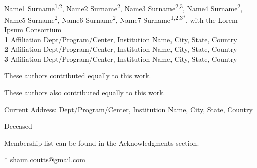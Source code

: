 \documentclass[10pt,letterpaper]{article}
\date{}
\begin{document}
\vspace*{0.2in}

\begin{flushleft}
{\Large
\textbf{} %
}
\newline
\\
Name1 Surname\textsuperscript{1,2\Yinyang},
Name2 Surname\textsuperscript{2\Yinyang},
Name3 Surname\textsuperscript{2,3\textcurrency},
Name4 Surname\textsuperscript{2},
Name5 Surname\textsuperscript{2\ddag},
Name6 Surname\textsuperscript{2\ddag},
Name7 Surname\textsuperscript{1,2,3*},
with the Lorem Ipsum Consortium\textsuperscript{\textpilcrow}
\\
\bigskip
\textbf{1} Affiliation Dept/Program/Center, Institution Name, City, State, Country
\\
\textbf{2} Affiliation Dept/Program/Center, Institution Name, City, State, Country
\\
\textbf{3} Affiliation Dept/Program/Center, Institution Name, City, State, Country
\\
\bigskip

% 
%
\Yinyang These authors contributed equally to this work.

\ddag These authors also contributed equally to this work.

\textcurrency Current Address: Dept/Program/Center, Institution Name, City, State, Country %

\dag Deceased

\textpilcrow Membership list can be found in the Acknowledgments section.

* shaun.coutts@gmail.com

\end{flushleft}
\end{document}
